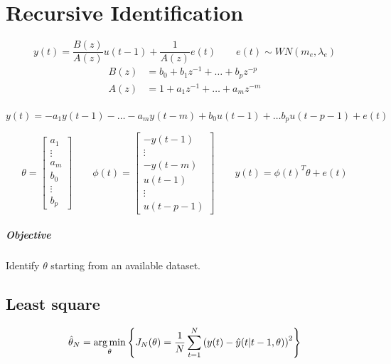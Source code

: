 \chapter{Recursive Identification}

\begin{rem}
    \[
        y(t) = \frac{B(z)}{A(z)}u(t-1) + \frac{1}{A(z)}e(t) \qquad e(t) \sim WN(m_e, \lambda_e)
    \]
    \begin{align*}
        B(z) &= b_0 + b_1z^{-1} + \ldots + b_pz^{-p} \\
        A(z) &= 1 + a_1z^{-1} + \ldots + a_mz^{-m} \\
    \end{align*}

    \[
        y(t) = -a_1y(t-1) - \ldots - a_my(t-m) + b_0u(t-1) + \ldots b_pu(t-p-1) + e(t)
    \]

    \[
        \theta = \begin{bmatrix}
            a_1 \\ \vdots \\ a_m \\
            b_0 \\ \vdots \\ b_p
        \end{bmatrix} \qquad
        \phi(t) = \begin{bmatrix}
            -y(t-1) \\ \vdots \\ -y(t-m) \\
            u(t-1) \\ \vdots \\ u(t-p-1)
        \end{bmatrix}
        \qquad
        y(t) = \phi(t)^T\theta+e(t)
    \]

    \paragraph{Objective} Identify $\theta$ starting from an available dataset.
\end{rem}

\section{Least square}

\[
    \hat{\theta}_N = \operatorname*{arg\,min}_\theta \left\{ J_N(\theta) = \frac{1}{N} \sum_{t=1}^N \left( y(t) - \hat{y}(t|t-1, \theta) \right)^2 \right\}
\]

